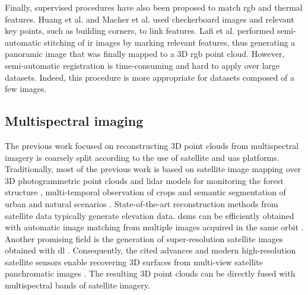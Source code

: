Finally, supervised procedures have also been proposed to match \acrshort{rgb} and thermal features. Huang et al. and Macher et al. \cite{huang_combining_2018, macher_combination_2019} used checkerboard images and relevant key points, such as building corners, to link features. Lafi et al. \cite{lafi_3d_2017} performed semi-automatic stitching of \acrshort{ir} images by marking relevant features, thus generating a panoramic image that was finally mapped to a 3D \acrshort{rgb} point cloud. However, semi-automatic registration is time-consuming and hard to apply over large datasets. Indeed, this procedure is more appropriate for datasets composed of a few images.

\subsection{Multispectral imaging}

The previous work focused on reconstructing 3D point clouds from multispectral imagery is coarsely split according to the use of satellite and \acrshort{uas} platforms. Traditionally, most of the previous work is based on satellite image mapping over 3D photogrammetric point clouds and \acrshort{lidar} models for monitoring the forest structure \cite{bolton_optimizing_2020, lechner_applications_2020}, multi-temporal observation of crops \cite{gadiraju_multimodal_2020, qadeer_spatio-temporal_2021} and semantic segmentation of urban and natural scenarios \cite{ballouch_toward_2022, saralioglu_semantic_2020}. State-of-the-art reconstruction methods from satellite data typically generate elevation data. \acrshort{dsm}s can be efficiently obtained with automatic image matching from multiple images acquired in the same orbit \cite{gui_automated_2021, qin_critical_2019}. Another promising field is the generation of super-resolution satellite images obtained with \acrshort{dl} \cite{gomez_experimental_2022, stucker_resdepth_2022}. Consequently, the cited advances and modern high-resolution satellite sensors enable recovering 3D surfaces from multi-view satellite panchromatic images \cite{han_state_2020, rothermel_photometric_2020}. The resulting 3D point clouds can be directly fused with multispectral bands of satellite imagery. 

